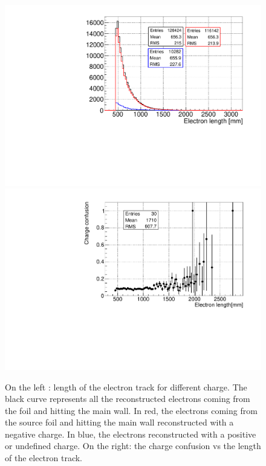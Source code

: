 \documentclass[main.tex]{subfiles}
\begin{document}
\begin{figure}[h!]
\begin{center}
\includegraphics[scale=0.34]{pictures/Chap5/length_source_charge_confusion_2.pdf}
\includegraphics[scale=0.34]{pictures/Chap5/charge_confusion_length_source.pdf}
\caption{On the left : length of the electron track for different charge. The black curve represents all the reconstructed electrons coming from the foil and hitting the main wall. In red, the electrons coming from the source foil and hitting the main wall reconstructed with a negative charge. In blue, the electrons reconstructed with a positive or undefined charge. On the right: the charge confusion vs the length of the electron track.}
\label{charge_confusion_source_plots}
\end{center}
\end{figure}
\end{document}
